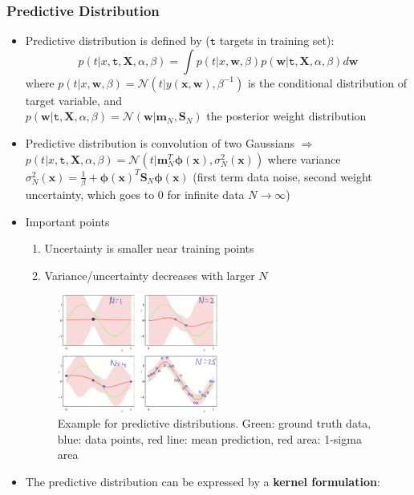 \subsubsection{Predictive Distribution}
\begin{itemize}
	\item Predictive distribution is defined by ($\bm{\mathtt{t}}$ targets in training set):
	$$p\left(t|x, \bm{\mathtt{t}}, \bm{X}, \alpha, \beta \right) = \int p\left(t|x, \bm{w},\beta\right)p\left(\bm{w}|\bm{\mathtt{t}}, \bm{X}, \alpha, \beta\right)d\bm{w}$$
	where $p\left(t|x, \bm{w},\beta\right) = \mathcal{N}\left(t|y\left(\bm{x},\bm{w}\right), \beta^{-1}\right)$ is the conditional distribution of target variable, and \\$p\left(\bm{w}|\bm{\mathtt{t}}, \bm{X}, \alpha, \beta\right) = \mathcal{N}\left(\bm{w}|\bm{m}_N, \bm{S}_N\right)$ the posterior weight distribution
	\item Predictive distribution is convolution of two Gaussians $\Rightarrow$ $p\left(t|x, \bm{\mathtt{t}}, \bm{X}, \alpha, \beta \right)=\mathcal{N}\left(t|\bm{m}_N^{T}\bm{\phi}(\bm{x}),\sigma_N^2(\bm{x}) \right)$
	where variance $\sigma_N^2(\bm{x})=\frac{1}{\beta} + \bm{\phi}(\bm{x})^T \bm{S}_N \bm{\phi}(\bm{x})$ (first term data noise, second weight uncertainty, which goes to 0 for infinite data $N\to\infty$)
	\item Important points
	\begin{enumerate}
		\item Uncertainty is smaller near training points
		\item Variance/uncertainty decreases with larger $N$
	\end{enumerate}
	\begin{figure}[ht]
		\centering
		\includegraphics[width=0.5\textwidth]{figures/bayesian_linear_regression_predictive_dist.png}
		\caption{Example for predictive distributions. Green: ground truth data, blue: data points, red line: mean prediction, red area: 1-sigma area}
	\end{figure}
	\item The predictive distribution can be expressed by a \textbf{kernel formulation}:

\end{itemize}
